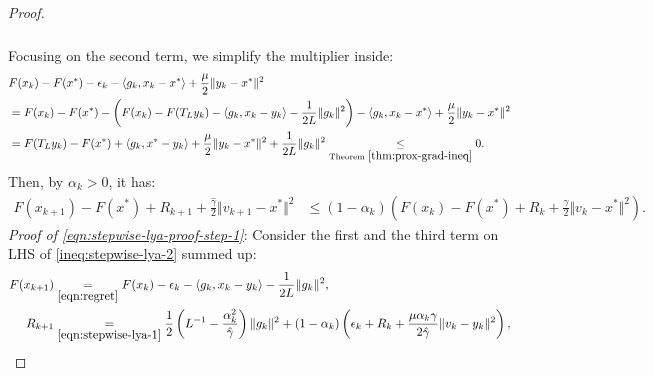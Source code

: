 \documentclass[12pt]{article}
\begin{document}
\begin{proof}
\begin{align}
\begin{split}
            \end{split}
        \end{align}
        Focusing on the second term, we simplify the multiplier inside:
        {\small
        \begin{align}
        \begin{split}\label{ineq:stepwise-lya-proof-ineq4}
            & F(x_k) - F(x^*) - \epsilon_k - \langle g_k, x_k - x^*\rangle + \frac{\mu}{2}\Vert y_k - x^*\Vert^2
            \\
            &=
            F(x_k) - F(x^*) - \left(
                F(x_k) - F(T_L y_k) - \langle g_k, x_k - y_k\rangle - \frac{1}{2L}\Vert g_k\Vert^2
            \right)- \langle g_k, x_k - x^*\rangle + \frac{\mu}{2}\Vert y_k - x^*\Vert^2
            \\
            &= F(T_L y_k) - F(x^*) + \langle g_k, x^* - y_k\rangle + \frac{\mu}{2}\Vert y_k - x^*\Vert^2
            + \frac{1}{2L}\Vert g_k\Vert^2 \underset{\text{Theorem }\ref{thm:prox-grad-ineq}}{\le} 0.
        \end{split}
        \end{align}
        }
        Then, by $\alpha_k > 0$, it has:
        {\small
        \begin{align*}
            F(x_{k + 1}) - F(x^*) + R_{k + 1} +
            \frac{\hat \gamma}{2}\Vert v_{k + 1} - x^*\Vert^2
            &\le
            (1 - \alpha_k)\left(
                F(x_k) - F(x^*) + R_k + \frac{\gamma}{2}\Vert v_k - x^*\Vert^2
            \right).
        \end{align*}
        } %
        \emph{Proof of \eqref{eqn:stepwise-lya-proof-step-1}}:
        Consider the first and the third term on LHS of \eqref{ineq:stepwise-lya-2} summed up:
        \begin{align}\label{eqn:stepwise-lya-proof-eqn1}
            F(x_{k + 1}) &\underset{\eqref{eqn:regret}}{=}
            F(x_k) - \epsilon_k - \langle  g_k, x_k - y_k\rangle - \frac{1}{2L}\Vert g_k\Vert^2,
            \notag
            \\
            R_{k + 1}
            &\underset{\eqref{eqn:stepwise-lya-1}}{=}
            \frac{1}{2}\left(
                L^{-1} - \frac{\alpha_k^2}{\hat \gamma}
            \right)\Vert g_k\Vert^2
            +
            (1 - \alpha_k)
            \left(
                \epsilon_k + R_k +
                \frac{\mu\alpha_k\gamma}{2\hat \gamma}
                \Vert v_k - y_k\Vert^2
            \right),

\end{align}
\end{proof}
\end{document}
